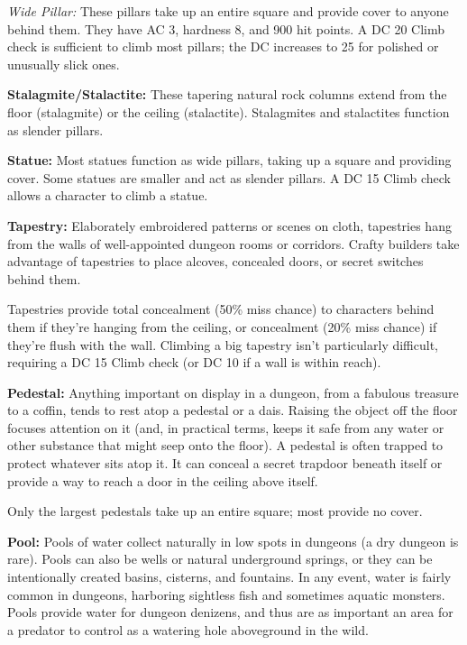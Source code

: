 \documentclass{article}
\begin{document}
\textit{Wide Pillar: }These pillars take up an entire square and provide cover 
to anyone behind them. They have AC 3, hardness 8, and 900 hit points. A DC 20 
Climb check is sufficient to climb most pillars; the DC increases to 25 for polished 
or unusually slick ones. 

\textbf{Stalagmite/Stalactite:} These tapering natural rock columns extend from 
the floor (stalagmite) or the ceiling (stalactite). Stalagmites and stalactites 
function as slender pillars.

\textbf{Statue: }Most statues function as wide pillars, taking up a square and 
providing cover. Some statues are smaller and act as slender pillars. A DC 15 Climb 
check allows a character to climb a statue. 

\textbf{Tapestry:} Elaborately embroidered patterns or scenes on cloth, tapestries 
hang from the walls of well-appointed dungeon rooms or corridors. Crafty builders 
take advantage of tapestries to place alcoves, concealed doors, or secret switches 
behind them.

Tapestries provide total concealment (50\% miss chance) to characters behind them 
if they're hanging from the ceiling, or concealment (20\% miss chance) if they're 
flush with the wall. Climbing a big tapestry isn't particularly difficult, requiring 
a DC 15 Climb check (or DC 10 if a wall is within reach).

\textbf{Pedestal:} Anything important on display in a dungeon, from a fabulous 
treasure to a coffin, tends to rest atop a pedestal or a dais. Raising the object 
off the floor focuses attention on it (and, in practical terms, keeps it safe from 
any water or other substance that might seep onto the floor). A pedestal is often 
trapped to protect whatever sits atop it. It can conceal a secret trapdoor beneath 
itself or provide a way to reach a door in the ceiling above itself.

Only the largest pedestals take up an entire square; most provide no cover.

\textbf{Pool:} Pools of water collect naturally in low spots in dungeons (a dry 
dungeon is rare). Pools can also be wells or natural underground springs, or they 
can be intentionally created basins, cisterns, and fountains. In any event, water 
is fairly common in dungeons, harboring sightless fish and sometimes aquatic monsters. 
Pools provide water for dungeon denizens, and thus are as important an area for 
a predator to control as a watering hole aboveground in the wild.
\end{document}
